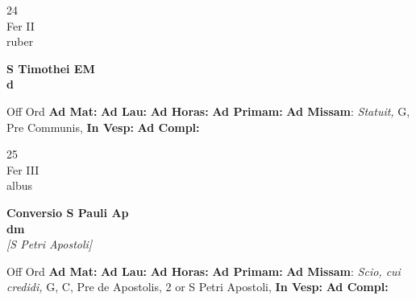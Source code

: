 \documentclass[10pt, openany]{book}
\begin{document}
        \begin{center}
            \begin{minipage}{3.5in}
                \vspace{2em}
                \begin{minipage}{0.5in}
                    {\Huge 24} \\
                    {\normalsize Fer II} \\
                    {\normalsize ruber}
                \end{minipage}
                \begin{minipage}{3.0in}
                    \textbf{ \large S Timothei EM \\
                    \textnormal{\normalsize d}} \\ 
                \end{minipage}
                \begin{justify}Off Ord
                    \textbf{Ad Mat: }
                    \textbf{Ad Lau: }
                    \textbf{Ad Horas: }
                    \textbf{Ad Primam: }\textbf{Ad Missam}: \textit{Statuit,} G, Pre Communis,  
                    \textbf{In Vesp: }
                    \textbf{Ad Compl: }
                \end{justify}
            \end{minipage}
        \end{center}
    
        \begin{center}
            \begin{minipage}{3.5in}
                \vspace{2em}
                \begin{minipage}{0.5in}
                    {\Huge 25} \\
                    {\normalsize Fer III} \\
                    {\normalsize albus}
                \end{minipage}
                \begin{minipage}{3.0in}
                    \textbf{ \large Conversio S Pauli Ap \\
                    \textnormal{\normalsize dm}} \\ \textit{[S Petri Apostoli]} \\ 
                \end{minipage}
                \begin{justify}Off Ord
                    \textbf{Ad Mat: }
                    \textbf{Ad Lau: }
                    \textbf{Ad Horas: }
                    \textbf{Ad Primam: }\textbf{Ad Missam}: \textit{Scio, cui credidi,} G, C, Pre de Apostolis, 2 or S Petri Apostoli,  
                    \textbf{In Vesp: }
                    \textbf{Ad Compl: }
                \end{justify}
            \end{minipage}
        \end{center}
    
\end{document}

